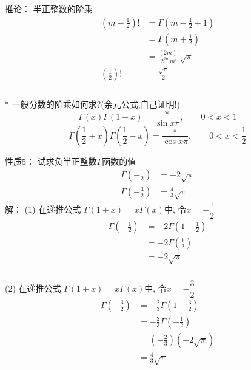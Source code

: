 \begin{frame}
	\alert{推论：} 半正整数的阶乘
	\[ \begin{aligned}
		(m-\frac{1}{2})! &= \Gamma (m-\frac{1}{2}+1) \\
						 &= \Gamma (m+\frac{1}{2}) \\
						 & = \frac{(2m)!}{2^{2m} m!}\sqrt{\pi} \\
		(\frac{1}{2})! &=  \frac{\sqrt{\pi}}{2} \\
	\end{aligned} \]
	~\\
* 一般分数的阶乘如何求?(余元公式,自己证明!)
\[ \Gamma(x)  \Gamma(1-x) =\frac{\pi}{\sin x \pi}, \qquad  0<x<1 \]
\[ \Gamma(\frac{1}{2}+x)  \Gamma(\frac{1}{2}-x) =\frac{\pi}{\cos x \pi}, \qquad  0<x<\frac{1}{2} \]
\end{frame}

\begin{frame}
	\alert{性质5：} 试求负半正整数$\Gamma$函数的值
	\begin{equation*}
		\begin{split}
		\Gamma(-\frac{1}{2}) &=-2\sqrt{\pi} \\ 
		\Gamma(-\frac{3}{2}) &=\frac{4}{3}\sqrt{\pi}
		\end{split}	
	\end{equation*}	
	\alert{解：} (1) 在递推公式 $\Gamma(1+x)=x \Gamma(x)$中, 令$x=-\dfrac{1}{2}$\\
	\[
	\begin{aligned}
		 \Gamma(-\frac{1}{2})&= -2 \Gamma(1-\frac{1}{2})\\
		 &=-2 \Gamma(\frac{1}{2})\\
		 &=-2 \sqrt{\pi}
	\end{aligned}	
	\]
\end{frame}

\begin{frame}
	  \frametitle{}
	(2) 在递推公式 $\Gamma(1+x)=x \Gamma(x)$中, 令$x=-\dfrac{3}{2}$\\
	\[
	\begin{aligned}
		 \Gamma(-\frac{3}{2})&= -\frac{2}{3} \Gamma(1-\frac{3}{2})\\
		 &=-\frac{2}{3} \Gamma(-\frac{1}{2})\\
		 &=(-\frac{2}{3})(-2 \sqrt{\pi}) \\
		 &=\frac{4}{3}\sqrt{\pi} \\
	\end{aligned}	
	\] ~\\
\end{frame}

